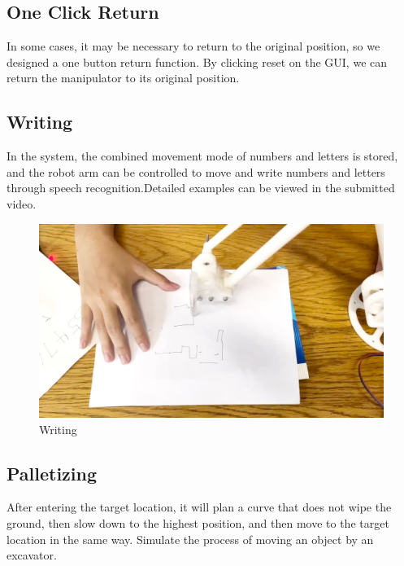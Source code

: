 \documentclass{hci}
\begin{document}
\subsection{One Click Return}
In some cases, it may be necessary to return to the original position, so we designed a one button return function. By clicking reset on the GUI, we can return the manipulator to its original position.

\subsection{Writing}
In the system, the combined movement mode of numbers and letters is stored, and the robot arm can be controlled to move and write numbers and letters through speech recognition.Detailed examples can be viewed in the submitted video.
\begin{figure}[htbp]
	\centering
	\includegraphics[width=0.8\linewidth]{figures/w1}
	\caption{Writing}
	\label{fig:W}
\end{figure}
\subsection{Palletizing}
After entering the target location, it will plan a curve that does not wipe the ground, then slow down to the highest position, and then move to the target location in the same way. Simulate the process of moving an object by an excavator.
\end{document}
